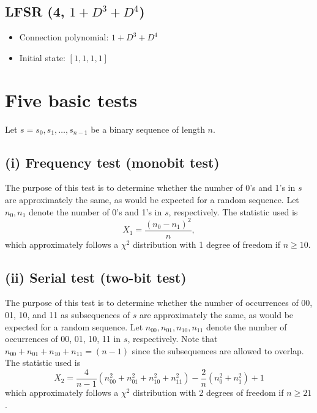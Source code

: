 \documentclass[12pt,openany]{book}
\theoremstyle{definition}
\begin{document}
\subsection*{LFSR (4, \( 1 + D^3 + D^4 \))}
\begin{itemize}
	\item Connection polynomial: \( 1 + D^3 + D^4 \)
	\item Initial state: \( [1, 1, 1, 1] \)
\end{itemize}


\section*{Five basic tests}

Let \( s = s_0, s_1, \ldots, s_{n-1} \) be a binary sequence of length \( n \).

\subsection*{(i) Frequency test (monobit test)}
The purpose of this test is to determine whether the number of 0’s and 1’s in \( s \) are approximately the same, as would be expected for a random sequence. Let \( n_0, n_1 \) denote the number of 0’s and 1’s in \( s \), respectively. The statistic used is
\[ X_1 = \frac{(n_0 - n_1)^2}{n}, \]
which approximately follows a \( \chi^2 \) distribution with 1 degree of freedom if \( n \geq 10 \).


\subsection*{(ii) Serial test (two-bit test)}
The purpose of this test is to determine whether the number of occurrences of 00, 01, 10, and 11 as subsequences of \( s \) are approximately the same, as would be expected for a random sequence. Let \( n_{00}, n_{01}, n_{10}, n_{11} \) denote the number of occurrences of 00, 01, 10, 11 in \( s \), respectively. Note that \( n_{00} + n_{01} + n_{10} + n_{11} = (n - 1) \) since the subsequences are allowed to overlap. The statistic used is
\[ X_2 = \frac{4}{n-1} (n_{00}^2 + n_{01}^2 + n_{10}^2 + n_{11}^2) - \frac{2}{n} (n_0^2 + n_1^2) + 1 \]
which approximately follows a \( \chi^2 \) distribution with 2 degrees of freedom if \( n \geq 21 \).
\end{document}
